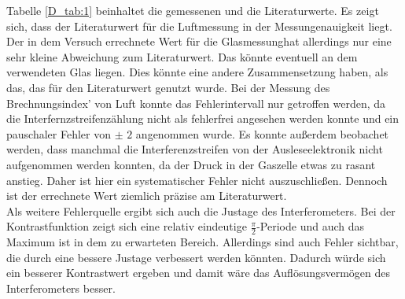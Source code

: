 \documentclass[
  bibliography=totoc,     %
  captions=tableheading,  %
  titlepage=firstiscover, %
]{scrartcl}
\begin{document}
Tabelle \ref{D_tab:1} beinhaltet die gemessenen und die Literaturwerte. Es zeigt sich, dass
der Literaturwert für die Luftmessung in der Messungenauigkeit liegt.
Der in dem Versuch errechnete Wert für die Glasmessunghat allerdings nur eine
sehr kleine Abweichung zum Literaturwert. Das könnte eventuell an dem verwendeten
Glas liegen. Dies könnte eine andere Zusammensetzung haben, als das, das für den Literaturwert
genutzt wurde.
Bei der Messung des Brechnungsindex' von Luft konnte das Fehlerintervall nur getroffen
werden, da die Interfernzstreifenzählung nicht als fehlerfrei angesehen werden konnte
und ein pauschaler Fehler von $\pm \,\, 2$ angenommen wurde.
Es konnte außerdem beobachet werden, dass manchmal die Interferenzstreifen
von der Ausleseelektronik nicht aufgenommen werden konnten, da der Druck in der
Gaszelle etwas zu rasant anstieg. Daher ist hier ein systematischer
Fehler nicht auszuschließen. Dennoch ist der errechnete Wert ziemlich präzise am
Literaturwert.\\
Als weitere Fehlerquelle ergibt sich auch die Justage des Interferometers.
Bei der Kontrastfunktion zeigt sich eine relativ eindeutige $\frac{\pi}{2}$-Periode
und auch das Maximum ist in dem zu erwarteten Bereich. Allerdings sind auch
Fehler sichtbar, die durch eine bessere Justage verbessert werden könnten.
Dadurch würde sich ein besserer Kontrastwert ergeben und damit wäre das Auflösungsvermögen
des Interferometers besser.


\newpage
\nocite{*}
\printbibliography
\end{document}
